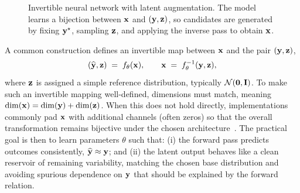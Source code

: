 \begin{figure}[h]
  \centering
  
  \caption[INN architecture]{Invertible neural network with latent augmentation. The model learns a bijection between $\mathbf{x}$ and $(\mathbf{y},\mathbf{z})$, so candidates are generated by fixing $\mathbf{y}^{\star}$, sampling $\mathbf{z}$, and applying the inverse pass to obtain $\mathbf{x}$.}
  \label{fig:inn_architecture}
\end{figure}


A common construction defines an invertible map between $\mathbf{x}$ and the pair $(\mathbf{y},\mathbf{z})$,
\begin{equation}
  (\widehat{\mathbf{y}},\mathbf{z}) \;=\; f_\theta(\mathbf{x}),
  \qquad
  \mathbf{x} \;=\; f_\theta^{-1}(\mathbf{y},\mathbf{z}),
  \label{eq:inn_bijection}
\end{equation}
where $\mathbf{z}$ is assigned a simple reference distribution, typically $\mathcal{N}(\mathbf{0},\mathbf{I})$.
To make such an invertible mapping well-defined, dimensions must match, meaning $\dim(\mathbf{x})=\dim(\mathbf{y})+\dim(\mathbf{z})$. When this does not hold directly, implementations commonly pad $\mathbf{x}$ with additional channels (often zeros) so that the overall transformation remains bijective under the chosen architecture~\cite{Ardizzone2019INN}. The practical goal is then to learn parameters $\theta$ such that: (i) the forward pass predicts outcomes consistently, $\widehat{\mathbf{y}}\approx \mathbf{y}$; and (ii) the latent output behaves like a clean reservoir of remaining variability, matching the chosen base distribution and avoiding spurious dependence on $\mathbf{y}$ that should be explained by the forward relation.

